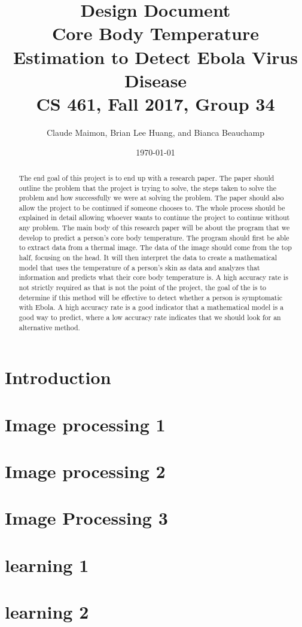 \documentclass[10pt, draftclsnofoot, onecolumn]{IEEEtran}
\title{%
  Design Document \\
  \vspace{0.4cm}
  \large Core Body Temperature Estimation to Detect Ebola Virus Disease \\
  \vspace{0.4cm}
  \large CS 461, Fall 2017, Group 34\\
    }
\author{Claude Maimon, Brian Lee Huang, and Bianca Beauchamp}
\date{\today}
\begin{document}
\maketitle

\begin{abstract}
	The end goal of this project is to end up with a research paper. The paper should outline the problem that the project is trying to solve, the steps taken to solve the problem and how successfully we were
	at solving the problem. The paper should also allow the project to be continued if someone chooses to. The whole process should be explained in detail allowing whoever wants to continue the
	project to continue without any problem. The main body of this research paper will be about the program that we develop to predict a person's core body temperature. The program should first be able to
	extract data from a thermal image. The data of the image should come from the top half, focusing on the head. It will then interpret the data to create a mathematical model that uses the temperature of a 
	person's skin as data and analyzes that information and predicts what their core body temperature is. A high accuracy rate is not strictly required as that is not the point of the project, 
	the goal of the is to determine if this method will be effective to detect whether a person is symptomatic with Ebola. A high accuracy rate is a good indicator that a mathematical model
	is a good way to predict, where a low accuracy rate indicates that we should look for an alternative method.
\end{abstract}

\newpage
\section{Introduction}
\section{Image processing 1}
\section{Image processing 2}
\section{Image Processing 3}
\section{learning 1}
\section{learning 2}
\end{document}
